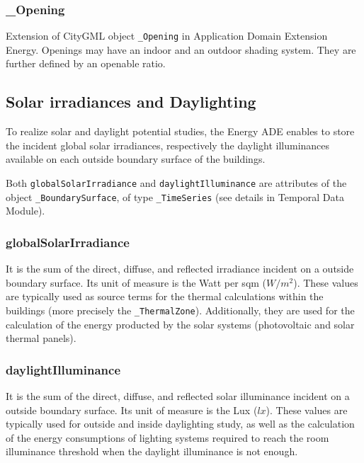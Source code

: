 \documentclass[a4paper,12pt]{article}
\begin{document}
\subsubsection{\_Opening}\label{opening}

Extension of CityGML object \texttt{\_Opening} in Application Domain
Extension Energy. Openings may have an indoor and an outdoor shading
system. They are further defined by an openable ratio.

\subsection{Solar irradiances and
Daylighting}\label{solar-irradiances-and-daylighting}

To realize solar and daylight potential studies, the Energy ADE enables
to store the incident global solar irradiances, respectively the
daylight illuminances available on each outside boundary surface of the
buildings.

Both \texttt{globalSolarIrradiance} and \texttt{daylightIlluminance} are
attributes of the object \texttt{\_BoundarySurface}, of type
\texttt{\_TimeSeries} (see details in Temporal Data Module).

\subsubsection{globalSolarIrradiance}\label{globalsolarirradiance}

It is the sum of the direct, diffuse, and reflected irradiance incident
on a outside boundary surface. Its unit of measure is the Watt per sqm
(\(W/m^2\)). These values are typically used as source terms for the
thermal calculations within the buildings (more precisely the
\texttt{\_ThermalZone}). Additionally, they are used for the calculation
of the energy producted by the solar systems (photovoltaic and solar
thermal panels).

\subsubsection{daylightIlluminance}\label{daylightilluminance}

It is the sum of the direct, diffuse, and reflected solar illuminance
incident on a outside boundary surface. Its unit of measure is the Lux
(\(lx\)). These values are typically used for outside and inside
daylighting study, as well as the calculation of the energy consumptions
of lighting systems required to reach the room illuminance threshold
when the daylight illuminance is not enough.
\end{document}
